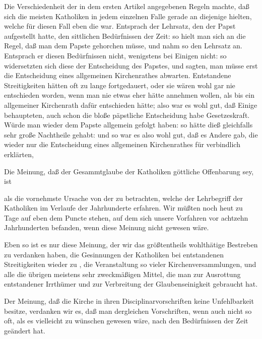 \begin{aufza}
\item Die Verschiedenheit der in dem ersten Artikel angegebenen Regeln machte, daß sich die meisten Katholiken in jedem einzelnen Falle gerade an diejenige hielten, welche für diesen Fall eben die  war. Entsprach der Lehrsatz, den der Papst aufgestellt hatte, den sittlichen Bedürfnissen der Zeit: so hielt man sich an die Regel, daß man dem Papste gehorchen müsse, und nahm so den Lehrsatz an. Entsprach er diesen Bedürfnissen nicht, wenigstens bei Einigen nicht: so widersetzten sich diese der Entscheidung des Papstes, und sagten, man müsse erst die Entscheidung eines allgemeinen Kirchenrathes abwarten. Entstandene Streitigkeiten hätten oft zu lange fortgedauert, oder sie wären wohl gar nie entschieden worden, wenn man nie etwas eher hätte annehmen wollen, als bis ein allgemeiner Kirchenrath dafür entschieden hätte; also war es wohl gut, daß Einige behaupteten, auch schon die bloße päpstliche Entscheidung habe Gesetzeskraft. Würde man wieder dem Papste allgemein gefolgt haben: so hätte dieß gleichfalls sehr große Nachtheile gehabt: und so war es also wohl gut, daß es Andere gab, die wieder nur die Entscheidung eines allgemeinen Kirchenrathes für verbindlich erklärten, \usw\
\item Die Meinung, daß der Gesammtglaube der Katholiken göttliche Offenbarung sey, ist
\begin{aufzb}
\item als die vornehmste Ursache von der  zu betrachten, welche der Lehrbegriff der Katholiken im Verlaufe der Jahrhunderte erfahren. Wir müßten noch heut zu Tage auf eben dem Puncte stehen, auf dem sich unsere Vorfahren vor achtzehn Jahrhunderten befanden, wenn diese Meinung nicht gewesen wäre.~
\item Eben so ist es nur diese Meinung, der wir das größtentheils wohlthätige Bestreben zu verdanken haben, die Gesinnungen der Katholiken bei entstandenen Streitigkeiten wieder zu \RWbet{vereinigen}, die Veranstaltung so vieler Kirchenversammlungen, und alle die übrigen meistens sehr zweckmäßigen Mittel, die man zur Ausrottung entstandener Irrthümer und zur Verbreitung der Glaubenseinigkeit gebraucht hat.
\end{aufzb}
\item Der Meinung, daß die Kirche in ihren Disciplinarvorschriften keine Unfehlbarkeit besitze, verdanken wir es, daß man dergleichen Vorschriften, wenn auch nicht so oft, als es vielleicht zu wünschen gewesen wäre, nach den Bedürfnissen der Zeit geändert hat.

\end{aufza}
